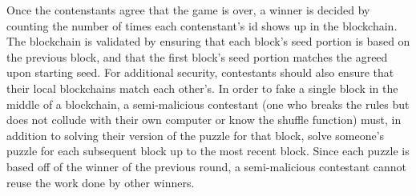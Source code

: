 \documentclass[leqno,12pt]{article}
\begin{document}
Once the contenstants agree that the game is over, a winner is decided by counting the number of times each contenstant's id shows up in the blockchain. The blockchain is validated by ensuring that each block's seed portion is based on the previous block, and that the first block's seed portion matches the agreed upon starting seed. For additional security, contestants should also ensure that their local blockchains match each other's. In order to fake a single block in the middle of a blockchain, a semi-malicious contestant (one who breaks the rules but does not collude with their own computer or know the shuffle function) must, in addition to solving their version of the puzzle for that block, solve someone's puzzle for each subsequent block up to the most recent block. Since each puzzle is based off of the winner of the previous round, a semi-malicious contestant cannot reuse the work done by other winners.
\end{document}
